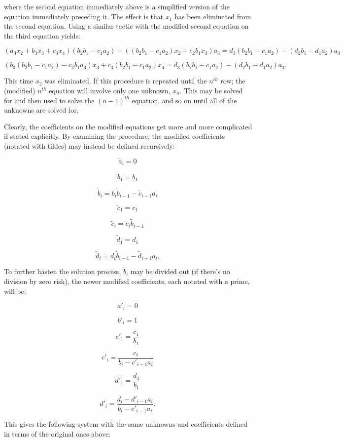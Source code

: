 \documentclass[preprint,12pt,3p]{elsarticle}
\begin{document}
where the second equation immediately above is a simplified version of
the equation immediately preceding it. The effect is that \(x_1\) has
been eliminated from the second equation. Using a similar tactic with
the modified second equation on the third equation yields:

\[(a_3 x_2 + b_3 x_3 + c_3 x_4) (b_2 b_1 - c_1 a_2) -
((b_2 b_1 - c_1 a_2) x_2 + c_2 b_1 x_3) a_3
= d_3 (b_2 b_1 - c_1 a_2) - (d_2 b_1 - d_1 a_2) a_3
\,\]

\[(b_3 (b_2 b_1 - c_1 a_2) - c_2 b_1 a_3 )x_3 + c_3 (b_2 b_1 - c_1 a_2) x_4
= d_3 (b_2 b_1 - c_1 a_2) - (d_2 b_1 - d_1 a_2) a_3.
\,\]

This time \(x_2\) was eliminated. If this procedure is repeated until
the \(n^{th}\) row; the (modified) \(n^{th}\) equation will involve only
one unknown, \(x_n\). This may be solved for and then used to solve the
\((n - 1)^{th}\) equation, and so on until all of the unknowns are
solved for.

Clearly, the coefficients on the modified equations get more and more
complicated if stated explicitly. By examining the procedure, the
modified coefficients (notated with tildes) may instead be defined
recursively:

\[\tilde a_i = 0\,\]

\[\tilde b_1 = b_1\,\]

\[\tilde b_i = b_i \tilde b_{i - 1} - \tilde c_{i - 1} a_i\,\]

\[\tilde c_1 = c_1\,\]

\[\tilde c_i = c_i \tilde b_{i - 1}\,\]

\[\tilde d_1 = d_1\,\]

\[\tilde d_i = d_i \tilde b_{i - 1} - \tilde d_{i - 1} a_i.\,\]

To further hasten the solution process, \(\tilde b_i\) may be divided
out (if there's no division by zero risk), the newer modified
coefficients, each notated with a prime, will be:

\[a'_i = 0\,\]

\[b'_i = 1\,\]

\[c'_1 = \frac{c_1}{b_1}\,\]

\[c'_i = \frac{c_i}{b_i - c'_{i - 1} a_i}\,\]

\[d'_1 = \frac{d_1}{b_1}\,\]

\[d'_i = \frac{d_i - d'_{i - 1} a_i}{b_i - c'_{i - 1} a_i}.\,\]

This gives the following system with the same unknowns and coefficients
defined in terms of the original ones above:
\end{document}
